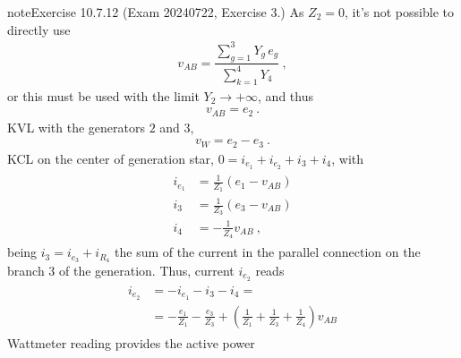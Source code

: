 \documentclass[letterpaper,10pt,italian]{jupyterBook}
\begin{document}
\begin{sphinxadmonition}{note}{Exercise 10.7.12 (Exam 2024\sphinxhyphen{}07\sphinxhyphen{}22, Exercise 3.)}
\sphinxAtStartPar
{} As \(Z_2 = 0\), it’s not possible to directly use
\begin{equation*}
\begin{split}v_{AB} = \dfrac{ \sum_{g=1}^{3} Y_g \, e_g }{\sum_{k=1}^{4} Y_4} \ ,\end{split}
\end{equation*}
\sphinxAtStartPar
or this must be used with the limit \(Y_2 \rightarrow + \infty\), and thus
\begin{equation*}
\begin{split}v_{AB} = e_2 \ .\end{split}
\end{equation*}
\sphinxAtStartPar
{} KVL with the generators \(2\) and \(3\),
\begin{equation*}
\begin{split}v_W = e_2 - e_3 \ .\end{split}
\end{equation*}
\sphinxAtStartPar
{} KCL on the center of generation star, \(0 = i_{e_1} + i_{e_2} + i_{3} + i_{4}\), with
\begin{equation*}
\begin{split}\begin{aligned}
  i_{e_1} & =  \frac{1}{Z_1} ( e_1 - v_{AB} ) \\
  i_{3}   & =  \frac{1}{Z_3} ( e_3 - v_{AB} ) \\
  i_{4}   & = -\frac{1}{Z_4}   v_{AB}   \ ,
\end{aligned}\end{split}
\end{equation*}
\sphinxAtStartPar
being \(i_3 = i_{e_3} + i_{R_4}\) the sum of the current in the parallel connection on the branch \(3\) of the generation. Thus, current \(i_{e_2}\) reads
\begin{equation*}
\begin{split}\begin{aligned}
  i_{e_2} 
  & = - i_{e_1} - i_{3} - i_{4} = \\
  & = - \frac{e_1}{Z_1} - \frac{e_3}{Z_3} + \left(  \frac{1}{Z_1} + \frac{1}{Z_3} + \frac{1}{Z_4}  \right) v_{AB}
\end{aligned}\end{split}
\end{equation*}
\sphinxAtStartPar
{} Wattmeter reading provides the active power
\begin{equation*}

\end{equation*}
\end{sphinxadmonition}
\end{document}

